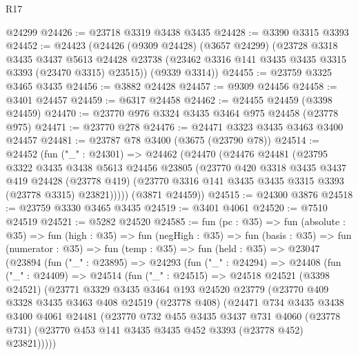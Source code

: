 \begin{lexlean}{R17}
\begin{coremodule}
    @24299
@24426 := @23718 @3319 @3438 @3435
@24428 := @3390 @3315 @3393
@24452 := @24423
    (@24426
      (@9309 @24428)
      (@3657 @24299)
      (@23728
        @3318
        @3435
        @3437
        @5613
        @24428
        @23738
        (@23462 @3316 @141 @3435 @3435 @3315 @3393 (@23470 @3315) @23515))
      (@9339 @3314))
@24455 := @23759 @3325 @3465 @3435
@24456 := @3882 @24428
@24457 := @9309 @24456
@24458 := @3401 @24457
@24459 := @6317 @24458
@24462 := @24455 @24459 (@3398 @24459)
@24470 := @23770 @976 @3324 @3435 @3464 @975 @24458 (@23778 @975)
@24471 := @23770 @278
@24476 := @24471 @3323 @3435 @3463 @3400 @24457
@24481 := @23787 @78 @3400 (@3675 (@23790 @78))
@24514 := @24452
    (fun ("_" : @24301) =>
    @24462
      (@24470
        (@24476
          @24481
          (@23795
            @3322
            @3435
            @3438
            @5613
            @24456
            @23805
            (@23770
              @420
              @3318
              @3435
              @3437
              @419
              @24428
              (@23778 @419)
              (@23770 @3316 @141 @3435 @3435 @3315 @3393 (@23778 @3315) @23821)))))
      (@3871 @24459))
@24515 := @24300 @3876
@24518 := @23759 @3330 @3465 @3435
@24519 := @3401 @4061
@24520 := @7510 @24519
@24521 := @5282 @24520
@24585 := fun (pc : @35) =>
  fun (absolute : @35) =>
  fun (high : @35) =>
  fun (negHigh : @35) =>
  fun (basis : @35) =>
  fun (numerator : @35) =>
  fun (temp : @35) =>
  fun (held : @35) =>
  @23047
    (@23894
      (fun ("_" : @23895) =>
      @24293
        (fun ("_" : @24294) =>
        @24408
          (fun ("_" : @24409) =>
          @24514
            (fun ("_" : @24515) =>
            @24518
              @24521
              (@3398 @24521)
              (@23771
                @3329
                @3435
                @3464
                @193
                @24520
                @23779
                (@23770
                  @409
                  @3328
                  @3435
                  @3463
                  @408
                  @24519
                  (@23778 @408)
                  (@24471
                    @734
                    @3435
                    @3438
                    @3400
                    @4061
                    @24481
                    (@23770
                      @732
                      @455
                      @3435
                      @3437
                      @731
                      @4060
                      (@23778 @731)
                      (@23770 @453 @141 @3435 @3435 @452 @3393 (@23778 @452) @23821)))))

\end{coremodule}
\end{lexlean}
